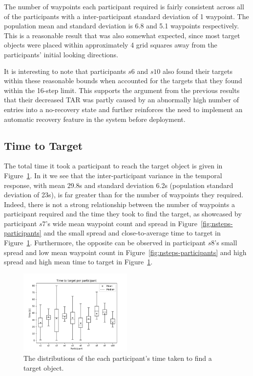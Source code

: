 \documentclass[a4paper, twoside]{article}
\begin{document}
The number of waypoints each participant required is fairly consistent across all of the participants with a inter-participant standard deviation of 1 waypoint. The population mean and standard deviation is 6.8 and 5.1 waypoints respectively. This is a reasonable result that was also somewhat expected, since most target objects were placed within approximately 4 grid squares away from the participants' initial looking directions.

It is interesting to note that participants $s6$ and $s10$ also found their targets within these reasonable bounds when accounted for the targets that they found within the 16-step limit. This supports the argument from the previous results that their decreased TAR was partly caused by an abnormally high number of entries into a no-recovery state and further reinforces the need to implement an automatic recovery feature in the system before deployment. 

\subsection{Time to Target}

\noindent The total time it took a participant to reach the target object is given in Figure~\ref{fig:time-participants}. In it we see that the inter-participant variance in the temporal response, with mean 29.8s and standard deviation 6.2s (population standard deviation of 23s), is far greater than for the number of waypoints they required. Indeed, there is not a strong relationship between the number of waypoints a participant required and the time they took to find the target, as showcased by participant $s7$'s wide mean waypoint count and spread in Figure~\ref{fig:nsteps-participants} and the small spread and close-to-average time to target in Figure~\ref{fig:time-participants}. Furthermore, the opposite can be observed in participant $s8$'s small spread and low mean waypoint count in Figure~\ref{fig:nsteps-participants} and high spread and high mean time to target in Figure~\ref{fig:time-participants}. 

\begin{figure}
  \centering
  \includegraphics[width=0.5\textwidth]{figures/boxplot_time_to_target_subjects.png}
  \caption{The distributions of the each participant's time taken to find a target object. }\label{fig:time-participants}
\end{figure}
\end{document}
